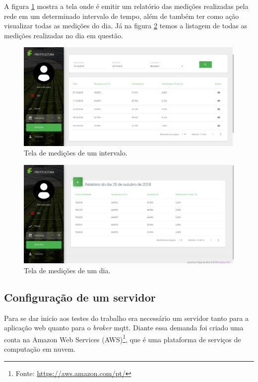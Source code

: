A figura \ref{fig:tela-relatorio-medicoes} mostra a tela onde é emitir um relatório das medições realizadas pela rede em um determinado intervalo de tempo, além de também ter como ação visualizar todas as medições do dia. Já na figura \ref{fig:tela-relatorio-medicoes-dia} temos a listagem de todas as medições realizadas no dia em questão.

\begin{figure}[H]
    \centering
    \includegraphics[scale=0.3]{04-figuras/tela_relatorio_medicoes.png}
    \caption{Tela de medições de um intervalo.}
    \vspace{-\baselineskip}
    \label{fig:tela-relatorio-medicoes}
\end{figure}

\begin{figure}[H]
    \centering
    \includegraphics[scale=0.3]{04-figuras/tela_relatorio_medicoes_dia.png}
    \caption{Tela de medições de um dia.}
    \vspace{-\baselineskip}
    \label{fig:tela-relatorio-medicoes-dia}
\end{figure}

\subsection{Configuração de um servidor}
Para se dar inicio aos testes do trabalho era necessário um servidor tanto para a aplicação web quanto para o \textit{broker} mqtt. Diante essa demanda foi criado uma conta na Amazon Web Services (AWS)\footnote{Fonte: \url{https://aws.amazon.com/pt/}}, que é uma plataforma de serviços de computação em nuvem.

